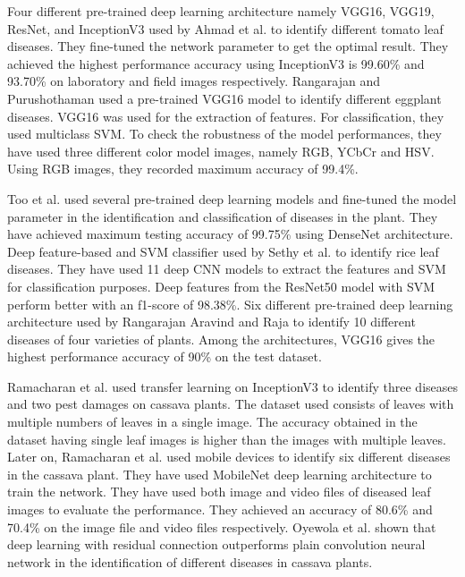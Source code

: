 Four different pre-trained deep learning architecture namely VGG16, VGG19, ResNet, and InceptionV3 used by Ahmad et al.  to identify different tomato leaf diseases. They fine-tuned the network parameter to get the optimal result. They achieved the highest performance accuracy using InceptionV3 is 99.60\% and 93.70\% on laboratory and field images respectively. Rangarajan and Purushothaman  used a pre-trained VGG16 model to identify different eggplant diseases. VGG16 was used for the extraction of features. For classification, they used multiclass SVM. To check the robustness of the model performances, they have used three different color model images, namely RGB, YCbCr and HSV. Using RGB images, they recorded maximum accuracy of 99.4\%.

Too et al.  used several pre-trained deep learning models and fine-tuned the model parameter in the identification and classification of diseases in the plant. They have achieved maximum testing accuracy of 99.75\% using DenseNet architecture. Deep feature-based and SVM classifier used by Sethy et al.  to identify rice leaf diseases. They have used 11 deep CNN models to extract the features and SVM for classification purposes. Deep features from the ResNet50 model with SVM perform better with an f1-score of 98.38\%. Six different pre-trained deep learning architecture used by Rangarajan Aravind and Raja  to identify 10 different diseases of four varieties of plants. Among the architectures, VGG16 gives the highest performance accuracy of 90\% on the test dataset.

Ramacharan et al.  used transfer learning on InceptionV3 to identify three diseases and two pest damages on cassava plants. The dataset used consists of leaves with multiple numbers of leaves in a single image. The accuracy obtained in the dataset having single leaf images is higher than the images with multiple leaves. Later on, Ramacharan et al.  used mobile devices to identify six different diseases in the cassava plant. They have used MobileNet deep learning architecture to train the network. They have used both image and video files of diseased leaf images to evaluate the performance. They achieved an accuracy of 80.6\% and 70.4\% on the image file and video files respectively. Oyewola et al.  shown that deep learning with residual connection outperforms plain convolution neural network in the identification of different diseases in cassava plants.

